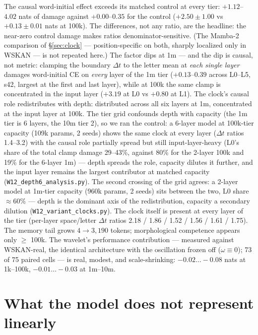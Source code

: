 \documentclass[11pt]{article}
\newcommand{\wskan}{WSKAN}
\newcommand{\Dt}{\Delta t}
\begin{document}
The causal word-initial effect exceeds its matched control at every tier:
$+1.12$--$4.02$ nats of damage against $+0.00$--$0.35$ for the control
($+2.50 \pm 1.00$ vs $+0.13 \pm 0.01$ nats at 100k). The differences, not
any ratio, are the headline: the near-zero control damage makes ratios
denominator-sensitive.
(The Mamba-2 comparison of \S\ref{sec:clock} --- position-specific on
both, sharply localized only in \wskan{} --- is not repeated here.)
The factor dips at 1m --- and the dip is causal, not metric: clamping the
boundary $\Dt$ to the letter mean at \emph{each single layer} damages
word-initial CE on \emph{every} layer of the 1m tier
($+0.13$--$0.39$ across L0--L5, s42, largest at the first and last
layer), while at 100k the same clamp is concentrated in the input
layer ($+3.19$ at L0 vs $+0.80$ at L1). The clock's causal role
redistributes with depth: distributed across all six layers at 1m,
concentrated at the input layer at 100k. The tier grid confounds depth
with capacity (the 1m tier is 6 layers, the 10m tier 2), so we ran the
control: a 6-layer model at 100k-tier capacity (109k params, 2 seeds)
shows the same clock at every layer ($\Dt$ ratios 1.4--3.2) with the
causal role partially spread but still input-layer-heavy (L0's share of
the total clamp damage 29--43\%, against 80\% for the 2-layer 100k and
19\% for the 6-layer 1m) --- depth spreads the role, capacity dilutes it
further, and the input layer remains the largest contributor at matched
capacity (\texttt{W12\_depth6\_analysis.py}). The second crossing of the
grid agrees: a 2-layer model at 1m-tier capacity (960k params, 2 seeds)
sits between the two, L0 share $\approx$60\% --- depth is the dominant
axis of the redistribution, capacity a secondary dilution
(\texttt{W12\_variant\_clocks.py}). The clock itself is present at
every layer of the tier
(per-layer space/letter $\Dt$ ratios 2.18 / 1.86 / 1.52 / 1.56 / 1.61 /
1.75).
The memory tail grows $4 \to 3{,}190$ tokens;
morphological competence appears only $\ge$ 100k. The wavelet's
performance contribution --- measured against \wskan{}-real, the identical
architecture with the oscillation frozen off ($\omega \equiv 0$); 73 of 75
paired cells --- is real, modest, and scale-shrinking: $-0.02\ldots -0.08$
nats at 1k--100k, $-0.01\ldots-0.03$ at 1m--10m.

\section{What the model does not represent linearly}
\label{sec:exclusion}
\end{document}
